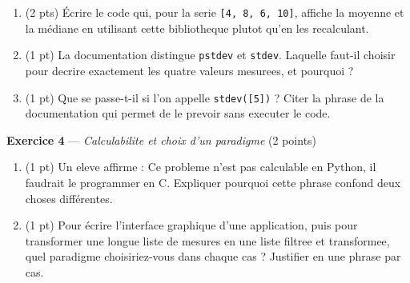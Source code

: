 \begin{enumerate}
  \item (2 pts) Écrire le code qui, pour la serie \lstinline{[4, 8, 6, 10]}, affiche la
  moyenne et la médiane en utilisant cette bibliotheque plutot qu'en les recalculant.
  \item (1 pt) La documentation distingue \lstinline{pstdev} et \lstinline{stdev}. Laquelle
  faut-il choisir pour decrire exactement les quatre valeurs mesurees, et pourquoi ?
  \item (1 pt) Que se passe-t-il si l'on appelle \lstinline{stdev([5])} ? Citer la phrase de
  la documentation qui permet de le prevoir sans executer le code.
\end{enumerate}


\bigskip

\textbf{Exercice 4} --- \textit{Calculabilite et choix d'un paradigme} \hfill (2 points)

\begin{enumerate}
  \item (1 pt) Un eleve affirme : \og{} Ce probleme n'est pas calculable en Python, il
  faudrait le programmer en C. \fg{} Expliquer pourquoi cette phrase confond deux choses
  différentes.
  \item (1 pt) Pour écrire l'interface graphique d'une application, puis pour transformer une
  longue liste de mesures en une liste filtree et transformee, quel paradigme choisiriez-vous
  dans chaque cas ? Justifier en une phrase par cas.
\end{enumerate}

